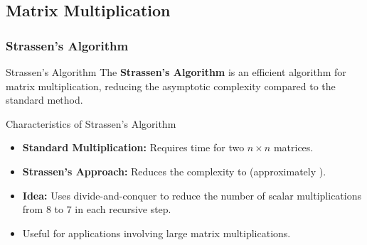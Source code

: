\newpage
\subsection{Matrix Multiplication}
\subsubsection{Strassen's Algorithm}
\begin{definition}[]{Strassen’s Algorithm}
    The \textbf{Strassen’s Algorithm} is an efficient algorithm for matrix multiplication, reducing the asymptotic complexity compared to the standard method.
\end{definition}

\begin{properties}[]{Characteristics of Strassen’s Algorithm}
    \begin{itemize}
        \item \textbf{Standard Multiplication:} Requires  time for two $n \times n$ matrices.
        \item \textbf{Strassen’s Approach:} Reduces the complexity to  (approximately ).
        \item \textbf{Idea:} Uses divide-and-conquer to reduce the number of scalar multiplications from $8$ to $7$ in each recursive step.
        \item Useful for applications involving large matrix multiplications.
    \end{itemize}
\end{properties}

